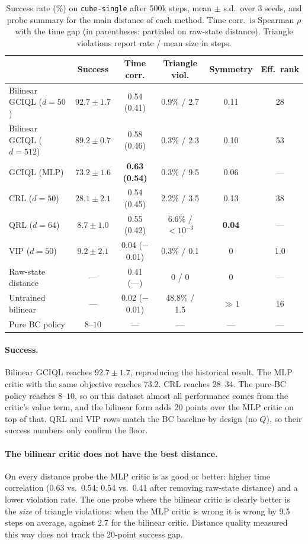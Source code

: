 \begin{table}[t]
\centering
\caption{Success rate (\%) on \texttt{cube-single} after 500k steps, mean $\pm$ s.d.\ over
3 seeds, and probe summary for the main distance of each method. Time corr.\ is Spearman
$\rho$ with the time gap (in parentheses: partialed on raw-state distance). Triangle
violations report rate / mean size in steps.}
\label{tab:probe}
\small
\begin{tabular}{lccccc}
\toprule
 & Success & Time corr. & Triangle viol. & Symmetry & Eff.\ rank \\
\midrule
Bilinear GCIQL ($d{=}50$) & $\mathbf{92.7\pm1.7}$ & 0.54 (0.41) & 0.9\% / 2.7 & 0.11 & 28 \\
Bilinear GCIQL ($d{=}512$) & $89.2\pm0.7$ & 0.58 (0.46) & 0.3\% / 2.3 & 0.10 & 53 \\
GCIQL (MLP) & $73.2\pm1.6$ & \textbf{0.63 (0.54)} & 0.3\% / 9.5 & 0.06 & --- \\
CRL ($d{=}50$) & $28.1\pm2.1$ & 0.54 (0.45) & 2.2\% / 3.5 & 0.13 & 38 \\
QRL ($d{=}64$) & $8.7\pm1.0$ & 0.55 (0.42) & 6.6\% / ${<}10^{-3}$ & \textbf{0.04} & --- \\
VIP ($d{=}50$) & $9.2\pm2.1$ & 0.04 ($-$0.01) & 0.3\% / 0.1 & 0 & 1.0 \\
\midrule
Raw-state distance & --- & 0.41 (---) & 0 / 0 & 0 & --- \\
Untrained bilinear & --- & 0.02 ($-$0.01) & 48.8\% / 1.5 & $\gg 1$ & 16 \\
Pure BC policy & $8$--$10$ & --- & --- & --- & --- \\
\bottomrule
\end{tabular}
\end{table}

\paragraph{Success.}
Bilinear GCIQL reaches $92.7\pm1.7$, reproducing the historical result. The MLP critic with
the same objective reaches $73.2$. CRL reaches $28$--$34$. The pure-BC policy reaches
$8$--$10$, so on this dataset almost all performance comes from the critic's value term,
and the bilinear form adds 20 points over the MLP critic on top of that. QRL and VIP rows
match the BC baseline by design (no $Q$), so their success numbers only confirm the floor.

\paragraph{The bilinear critic does not have the best distance.}
On every distance probe the MLP critic is as good or better: higher time correlation (0.63
vs.\ 0.54; 0.54 vs.\ 0.41 after removing raw-state distance) and a lower violation rate.
The one probe where the bilinear critic is clearly better is the \emph{size} of triangle
violations: when the MLP critic is wrong it is wrong by 9.5 steps on average, against 2.7
for the bilinear critic. Distance quality measured this way does not track the 20-point
success gap.


